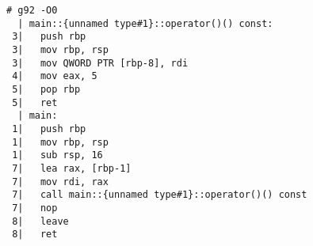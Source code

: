 \begin{lstlisting}[language={},numbers=none,title=\href{https://godbolt.org/z/R8qx3Q}{\texttt{godbolt.org/z/R8qx3Q}}]
# g92 -O0
  | main::{unnamed type#1}::operator()() const:
 3|   push rbp
 3|   mov rbp, rsp
 3|   mov QWORD PTR [rbp-8], rdi
 4|   mov eax, 5
 5|   pop rbp
 5|   ret
  | main:
 1|   push rbp
 1|   mov rbp, rsp
 1|   sub rsp, 16
 7|   lea rax, [rbp-1]
 7|   mov rdi, rax
 7|   call main::{unnamed type#1}::operator()() const
 7|   nop
 8|   leave
 8|   ret
\end{lstlisting}
